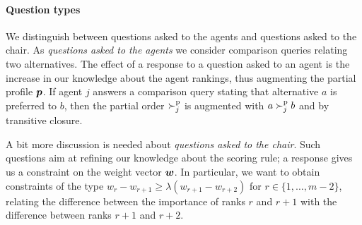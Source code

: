 \documentclass[runningheads]{llncs}
\theoremstyle{remark}
\begin{document}


\paragraph{Question types}
We distinguish between questions asked to the agents and questions asked to the chair.
As {\em questions asked to the agents} we consider comparison queries relating two alternatives.
The effect of a response to a question asked to an agent is the increase in our knowledge about the agent rankings, thus augmenting the partial profile ${\bm{p}}$. 
If agent $j$ answers a comparison query stating that alternative $a$ is preferred to $b$, then the partial order $\succ^\text{p}_j$ is augmented with $a \succ^\text{p}_j b$ and by transitive closure.

A bit more discussion is needed about {\em questions asked to the chair}.
Such questions aim at refining our knowledge about the scoring rule; a response gives us a constraint on the weight vector $\bm{w}$.
In particular, we want to obtain constraints of the type $w_{r} - w_{r+1} \geq \lambda (w_{r+1} - w_{r+2})$ for $r \in \{1,\ldots,m-2\}$, relating the difference between the importance of ranks $r$ and $r+1$ with the difference between ranks $r+1$ and $r+2$.
\end{document}
